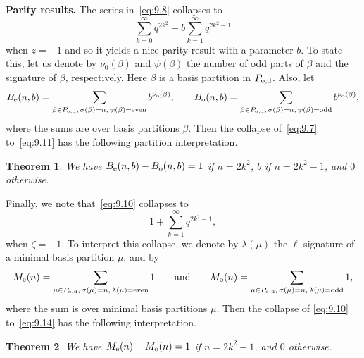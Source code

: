 \documentclass[pdftex]{sigma}
\numberwithin{equation}{section}
\newtheorem{Theorem}{Theorem}[section]
\theoremstyle{definition}
\begin{document}
{\bf Parity results.}
The series in~\eqref{eq:9.8} collapses to
\begin{equation}
\sum^{\infty}_{k=0}q^{2k^2}+b\sum^{\infty}_{k=1}q^{2k^2-1}\label{eq:9.11}
\end{equation}
when $z=-1$ and so it yields a nice parity result with a parameter $b$.
To state this, let us denote by $\nu_0(\beta)$ and $\psi(\beta)$ the number
of odd parts of $\beta$ and the signature of $\beta$, respectively. Here
$\beta$ is a basis partition in $P_{\rm o,d}$. Also, let
\begin{equation*}
B_{\rm e}(n,b)=\sum_{\beta\in P_{\rm o,d},\, \sigma(\beta)=n,\, \psi(\beta)= {\rm even}}b^{\nu_{\rm o}(\beta)},%
\qquad
B_{\rm o}(n,b)=\sum_{\beta\in P_{\rm o,d},\, \sigma(\beta)=n, \, \psi(\beta)={\rm odd}}b^{\nu_{\rm o}(\beta)},%
\end{equation*}
where the sums are over basis partitions $\beta$. Then the collapse of~\eqref{eq:9.7}
to~\eqref{eq:9.11} has the following partition interpretation.

\begin{Theorem}
We have $B_{\rm e}(n,b)-B_{\rm o}(n,b)= 1$ if $n=2k^2$, $b$ if $n=2k^2-1$, and $0$ otherwise.
\end{Theorem}

Finally, we note that~\eqref{eq:9.10} collapses to
\begin{equation}
1+\sum^{\infty}_{k=1}q^{2k^2-1},\label{eq:9.14}
\end{equation}
when $\zeta=-1$. To interpret this collapse, we denote by $\lambda(\mu)$
the $\ell$-signature of a minimal basis partition $\mu$, and by
\begin{equation*}
M_{\rm e}(n)=\sum_{\mu\in P_{\rm o,d},\, \sigma(\mu)=n, \,\lambda(\mu)= {\rm even}}1 %
\qquad \text{and}\qquad
M_{\rm o}(n)=\sum_{\mu\in P_{\rm o,d},\, \sigma(\mu)=n, \, \lambda(\mu)= {\rm odd}} 1,%
\end{equation*}
where the sum is over minimal basis partitions $\mu$. Then the collapse of
\eqref{eq:9.10} to~\eqref{eq:9.14} has the following interpretation.

\begin{Theorem}%
We have $M_{\rm e}(n)-M_{\rm o}(n)= 1$ if $n=2k^2-1$, and $0$ otherwise.
\end{Theorem}
\end{document}
